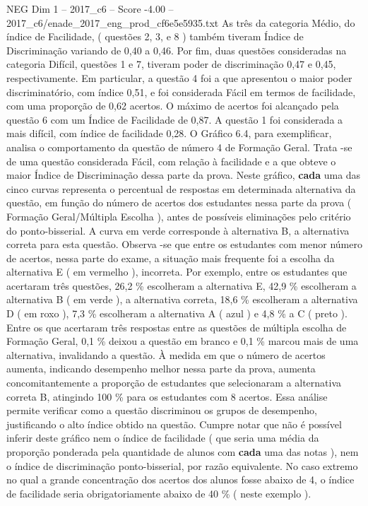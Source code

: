 \begin{textsample}{NEG Dim 1 – 2017\_c6 – Score -4.00 – 2017\_c6/enade\_2017\_eng\_prod\_cf6e5e5935.txt}
As três da categoria Médio, do índice de Facilidade, ( questões 2, 3, e 8 ) também tiveram Índice de Discriminação variando de 0,40 a 0,46.
Por fim, duas questões consideradas na categoria Difícil, questões 1 e 7, tiveram poder de discriminação 0,47 e 0,45, respectivamente.
Em particular, a questão 4 foi a que apresentou o maior poder discriminatório, com índice 0,51, e foi considerada Fácil em termos de facilidade, com uma proporção de 0,62 acertos.
O máximo de acertos foi alcançado pela questão 6 com um Índice de Facilidade de 0,87.
A questão 1 foi considerada a mais difícil, com índice de facilidade 0,28.
O Gráfico 6.4, para exemplificar, analisa o comportamento da questão de número 4 de Formação Geral.
Trata -se de uma questão considerada Fácil, com relação à facilidade e a que obteve o maior Índice de Discriminação dessa parte da prova.
Neste gráfico, \textbf{cada} uma das cinco curvas representa o percentual de respostas em determinada alternativa da questão, em função do número de acertos dos estudantes nessa parte da prova ( Formação Geral/Múltipla Escolha ), antes de possíveis eliminações pelo critério do ponto-bisserial.
A curva em verde corresponde à alternativa B, a alternativa correta para esta questão.
Observa -se que entre os estudantes com menor número de acertos, nessa parte do exame, a situação mais frequente foi a escolha da alternativa E ( em vermelho ), incorreta.
Por exemplo, entre os estudantes que acertaram três questões, 26,2 \% escolheram a alternativa E, 42,9 \% escolheram a alternativa B ( em verde ), a alternativa correta, 18,6 \% escolheram a alternativa D ( em roxo ), 7,3 \% escolheram a alternativa A ( azul ) e 4,8 \% a C ( preto ).
Entre os que acertaram três respostas entre as questões de múltipla escolha de Formação Geral, 0,1 \% deixou a questão em branco e 0,1 \% marcou mais de uma alternativa, invalidando a questão.
À medida em que o número de acertos aumenta, indicando desempenho melhor nessa parte da prova, aumenta concomitantemente a proporção de estudantes que selecionaram a alternativa correta B, atingindo 100 \% para os estudantes com 8 acertos.
Essa análise permite verificar como a questão discriminou os grupos de desempenho, justificando o alto índice obtido na questão.
Cumpre notar que não é possível inferir deste gráfico nem o índice de facilidade ( que seria uma média da proporção ponderada pela quantidade de alunos com \textbf{cada} uma das notas ), nem o índice de discriminação ponto-bisserial, por razão equivalente.
No caso extremo no qual a grande concentração dos acertos dos alunos fosse abaixo de 4, o índice de facilidade seria obrigatoriamente abaixo de 40 \% ( neste exemplo ).

\end{textsample}
